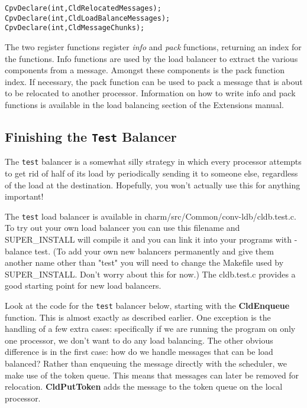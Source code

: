\begin{alltt}
CpvDeclare(int, CldRelocatedMessages);
CpvDeclare(int, CldLoadBalanceMessages);
CpvDeclare(int, CldMessageChunks);
\end{alltt}

The two register functions register {\sl info} and {\sl pack}
functions, returning an index for the functions.  Info functions are
used by the load balancer to extract the various components from a
message.  Amongst these components is the pack function index.  If
necessary, the pack function can be used to pack a message that is
about to be relocated to another processor.  Information on how
to write info and pack functions is available in the load balancing
section of the \converse{} Extensions manual. 

\subsection{Finishing the {\tt Test} Balancer}

The {\tt test} balancer is a somewhat silly strategy in which every
processor attempts to get rid of half of its load by periodically
sending it to someone else, regardless of the load at the
destination.  Hopefully, you won't actually use this for anything
important!

The {\tt test} load balancer is available in
charm/src/Common/conv-ldb/cldb.test.c.  To try out your own load
balancer you can use this filename and SUPER\_INSTALL will compile it
and you can link it into your \charmpp{} programs with -balance test.
(To add your own new balancers permanently and give them another name
other than "test" you will need to change the Makefile used by
SUPER\_INSTALL. Don't worry about this for now.)  The cldb.test.c
provides a good starting point for new load balancers.

Look at the code for the {\tt test} balancer below, starting with the
{\bf CldEnqueue} function.  This is almost exactly as described
earlier.  One exception is the handling of a few extra cases:
specifically if we are running the program on only one processor, we
don't want to do any load balancing.  The other obvious difference is
in the first case: how do we handle messages that can be load
balanced?  Rather than enqueuing the message directly with the
scheduler, we make use of the token queue.  This means that messages
can later be removed for relocation.  {\bf CldPutToken} adds the
message to the token queue on the local processor.

